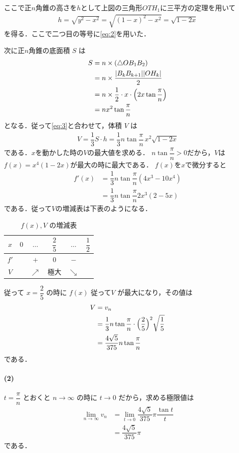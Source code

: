 \documentclass[../../main.tex]{subfiles}
\begin{document}
ここで正$n$角錐の高さを$h$として上図の三角形$OTH_1$に三平方の定理を用いて
\begin{align}
  h = \sqrt{y^2 - x^2} = \sqrt{(1-x)^2 - x^2} = \sqrt{1 - 2x} \label{eq:3}
\end{align}
を得る．ここで二つ目の等号に\cref{eq:2}を用いた．

次に正$n$角錐の底面積 $S$ は
\begin{align}
  S
  &= n \times (\triangle O B_1 B_2) \\
  &= n \times \dfrac{|B_{k}B_{k+1}||OH_{k}|}{2} \\
  &= n \times \dfrac{1}{2} \cdot x \cdot \Bigl(2x \tan\dfrac{\pi}{n}\Bigr) \\
  &= n x^2 \tan\dfrac{\pi}{n}
\end{align}
となる．従って\cref{eq:3}と合わせて，体積 $V$ は
\begin{align}
  V = \dfrac{1}{3} S \cdot h = \dfrac{1}{3} n \tan\dfrac{\pi}{n} \, x^2 \sqrt{1 - 2x} \label{eq:4}
\end{align}
である．$x$を動かした時の$V$の最大値を求める．
$n \tan\dfrac{\pi}{n}>0$だから，$V$は$f(x)=x^4(1-2x)$が最大の時に最大である．
$f(x)$を$x$で微分すると
\begin{align}
  f'(x)
  &= \dfrac{1}{3} n \tan\dfrac{\pi}{n} \left(4x^3-10x^4\right) \\
  &= \dfrac{1}{3} n \tan\dfrac{\pi}{n} 2x^3\left(2-5x\right)
\end{align}
である．従って$V$の増減表は下表のようになる．

\begin{table}[htb]
  \centering
  \caption{$f(x), V$ の増減表}
  \begin{tabular}{c|c|c|c|c|c}
    $x$ & $0$ & $\dots$ & $\dfrac{2}{5}$ & $\dots$ & $\dfrac{1}{2}$ \\ \hline
    $f'$ & & $+$ & $0$ & $-$ & \\ \hline
    $V$ & & $\nearrow$ & 極大 & $\searrow$ &
  \end{tabular}
\end{table}

従って $x = \dfrac{2}{5}$ の時に $f(x)$ 従って$V$ が最大になり，その値は
\begin{align}
  V &= v_n \\
  &= \dfrac{1}{3} n \tan\dfrac{\pi}{n} \cdot \Bigl(\dfrac{2}{5}\Bigr)^2 \sqrt{\dfrac{1}{5}} \\
  &= \dfrac{4\sqrt{5}}{375} n \tan\dfrac{\pi}{n} \label{eq:5}
\end{align}
である．

\paragraph{(2)}

$t = \dfrac{\pi}{n}$ とおくと $n \to \infty$ の時に $t \to 0$ だから，求める極限値は
\begin{align}
  \lim_{n\to\infty}v_n
  &= \lim_{t\to 0}\dfrac{4\sqrt{5}}{375} \pi \dfrac{\tan t}{t} \\
  &= \dfrac{4\sqrt{5}}{375} \pi
\end{align}
である．
\end{document}
